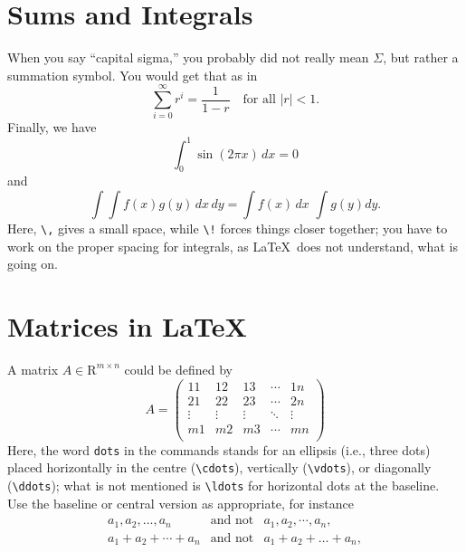 \section{Sums and Integrals}
When you say ``capital sigma,'' you probably did not really mean $\Sigma$,
but rather a summation symbol. You would get that as in\premathpar
\begin{displaymath}
  \sum_{i=0}^{\infty} r^i = \frac{1}{1 - r} \quad \mbox{for all $|r| < 1$}.
\end{displaymath}
Finally, we have\premathpar
\begin{displaymath}
  \int_0^1 \sin(2 \pi x) \, dx = 0
\end{displaymath}
and\premathpar
\begin{displaymath}
  \int \! \! \int f(x) g(y) \, dx \, dy = \int f(x) \, dx \,\, \int g(y) dy.
\end{displaymath}
Here, \verb+\,+ gives a small space, while \verb+\!+ forces things closer
together; you have to work on the proper spacing for integrals, as \LaTeX\
does not understand, what is going on.
\clearpage %
\section{Matrices in \LaTeX}
A matrix $A \in \mathrm{R}^{m \times n}$ could be defined by\premathpar
\begin{displaymath}
  A = \left( \begin{array}{ccccc}
        11     & 12     & 13     & \cdots & 1n     \\
        21     & 22     & 23     & \cdots & 2n     \\
        \vdots & \vdots & \vdots & \ddots & \vdots \\
        m1     & m2     & m3     & \cdots & mn     \\
      \end{array} \right)
\end{displaymath}
Here, the word \verb+dots+ in the commands stands for an ellipsis
(i.e., three dots) placed horizontally in the centre (\verb+\cdots+),
vertically (\verb+\vdots+), or diagonally (\verb+\ddots+); what is
not mentioned is \verb+\ldots+ for horizontal dots at the baseline.
Use the baseline or central version as appropriate, for instance\premathpar
\begin{eqnarray*}
  a_1, a_2, \ldots, a_n & \mbox{and not} & a_1, a_2, \cdots, a_n, \\
  a_1 + a_2 + \cdots + a_n & \mbox{and not} & a_1 + a_2 + \ldots + a_n, \\
\end{eqnarray*}

